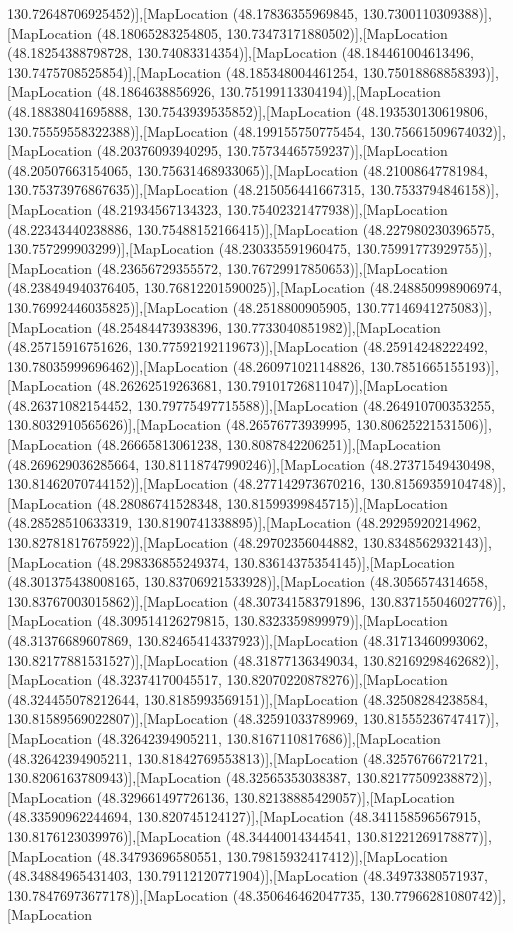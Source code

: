 130.72648706925452)],[MapLocation (48.17836355969845, 130.7300110309388)],[MapLocation (48.18065283254805, 130.73473171880502)],[MapLocation (48.18254388798728, 130.74083314354)],[MapLocation (48.184461004613496, 130.7475708525854)],[MapLocation (48.185348004461254, 130.75018868858393)],[MapLocation (48.1864638856926, 130.75199113304194)],[MapLocation (48.18838041695888, 130.7543939535852)],[MapLocation (48.193530130619806, 130.75559558322388)],[MapLocation (48.199155750775454, 130.75661509674032)],[MapLocation (48.20376093940295, 130.75734465759237)],[MapLocation (48.20507663154065, 130.75631468933065)],[MapLocation (48.21008647781984, 130.75373976867635)],[MapLocation (48.215056441667315, 130.7533794846158)],[MapLocation (48.21934567134323, 130.75402321477938)],[MapLocation (48.22343440238886, 130.75488152166415)],[MapLocation (48.227980230396575, 130.757299903299)],[MapLocation (48.230335591960475, 130.75991773929755)],[MapLocation (48.23656729355572, 130.76729917850653)],[MapLocation (48.238494940376405, 130.76812201590025)],[MapLocation (48.248850998906974, 130.76992446035825)],[MapLocation (48.2518800905905, 130.77146941275083)],[MapLocation (48.25484473938396, 130.7733040851982)],[MapLocation (48.25715916751626, 130.77592192119673)],[MapLocation (48.25914248222492, 130.78035999696462)],[MapLocation (48.260971021148826, 130.7851665155193)],[MapLocation (48.26262519263681, 130.79101726811047)],[MapLocation (48.26371082154452, 130.79775497715588)],[MapLocation (48.264910700353255, 130.8032910565626)],[MapLocation (48.26576773939995, 130.80625221531506)],[MapLocation (48.26665813061238, 130.8087842206251)],[MapLocation (48.269629036285664, 130.81118747990246)],[MapLocation (48.27371549430498, 130.81462070744152)],[MapLocation (48.277142973670216, 130.81569359104748)],[MapLocation (48.28086741528348, 130.81599399845715)],[MapLocation (48.28528510633319, 130.8190741338895)],[MapLocation (48.29295920214962, 130.82781817675922)],[MapLocation (48.29702356044882, 130.8348562932143)],[MapLocation (48.298336855249374, 130.83614375354145)],[MapLocation (48.301375438008165, 130.83706921533928)],[MapLocation (48.3056574314658, 130.83767003015862)],[MapLocation (48.307341583791896, 130.83715504602776)],[MapLocation (48.309514126279815, 130.8323359899979)],[MapLocation (48.31376689607869, 130.82465414337923)],[MapLocation (48.31713460993062, 130.82177881531527)],[MapLocation (48.31877136349034, 130.82169298462682)],[MapLocation (48.32374170045517, 130.82070220878276)],[MapLocation (48.324455078212644, 130.8185993569151)],[MapLocation (48.32508284238584, 130.81589569022807)],[MapLocation (48.32591033789969, 130.81555236747417)],[MapLocation (48.32642394905211, 130.8167110817686)],[MapLocation (48.32642394905211, 130.81842769553813)],[MapLocation (48.32576766721721, 130.8206163780943)],[MapLocation (48.32565353038387, 130.82177509238872)],[MapLocation (48.329661497726136, 130.82138885429057)],[MapLocation (48.33590962244694, 130.820745124127)],[MapLocation (48.341158596567915, 130.8176123039976)],[MapLocation (48.34440014344541, 130.81221269178877)],[MapLocation (48.34793696580551, 130.79815932417412)],[MapLocation (48.34884965431403, 130.79112120771904)],[MapLocation (48.34973380571937, 130.78476973677178)],[MapLocation (48.350646462047735, 130.77966281080742)],[MapLocation 